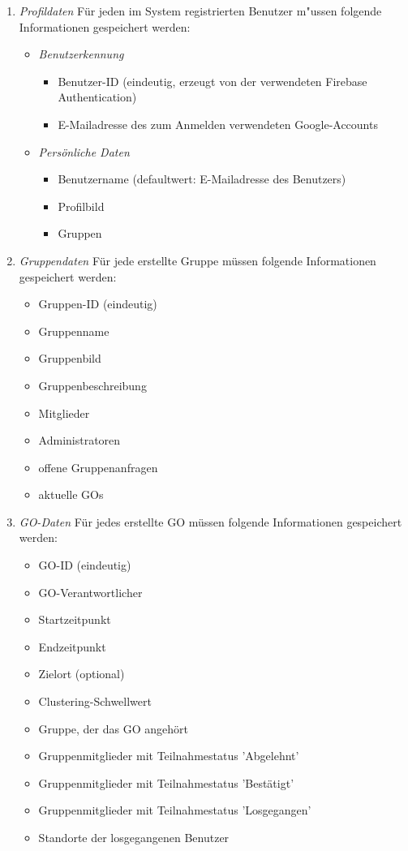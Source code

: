 \documentclass[parskip=full]{scrartcl}
\def\threedigits#1{%
  \ifnum#1<100 0\fi
  \ifnum#1<10 0\fi
  \number#1}
\begin{document}
\begin{enumerate}[label={\textbf{/D\protect\threedigits{\theenumi}0/}}, leftmargin=*]
	\item \textit{Profildaten} \label{Profildaten} Für jeden im System registrierten Benutzer m"ussen folgende Informationen gespeichert werden:
		\begin{itemize}
			\item \textit{Benutzerkennung}
				\begin{itemize}
					\item Benutzer-ID (eindeutig, erzeugt von der verwendeten Firebase Authentication)
					\item E-Mailadresse des zum Anmelden verwendeten Google-Accounts
				\end{itemize}
			\item \textit{Persönliche Daten} \label{persönliche Daten} 
			\begin{itemize}
			\item Benutzername (defaultwert: E-Mailadresse des Benutzers)
			\item Profilbild
			\item Gruppen
		\end{itemize}
		\end{itemize}
	
	\item \textit{Gruppendaten} Für jede erstellte Gruppe müssen folgende Informationen gespeichert werden:
	\begin{itemize}
		\item Gruppen-ID (eindeutig)
		\item Gruppenname
		\item Gruppenbild
		\item Gruppenbeschreibung
		\item Mitglieder
		\item Administratoren
		\item offene Gruppenanfragen %
		\item aktuelle GOs
	\end{itemize}
	\item \textit{GO-Daten} \label{GO-Daten}
	Für jedes erstellte GO müssen folgende Informationen gespeichert werden:
	\begin{itemize}
		\item GO-ID (eindeutig)
		\item GO-Verantwortlicher
		\item Startzeitpunkt
		\item Endzeitpunkt
		\item Zielort (optional)
		\item Clustering-Schwellwert
		\item Gruppe, der das GO angehört
		\item Gruppenmitglieder mit Teilnahmestatus 'Abgelehnt'
		\item Gruppenmitglieder mit Teilnahmestatus 'Bestätigt'
		\item Gruppenmitglieder mit Teilnahmestatus 'Losgegangen'
		\item Standorte der losgegangenen Benutzer
	\end{itemize}
\end{enumerate}
\end{document}
